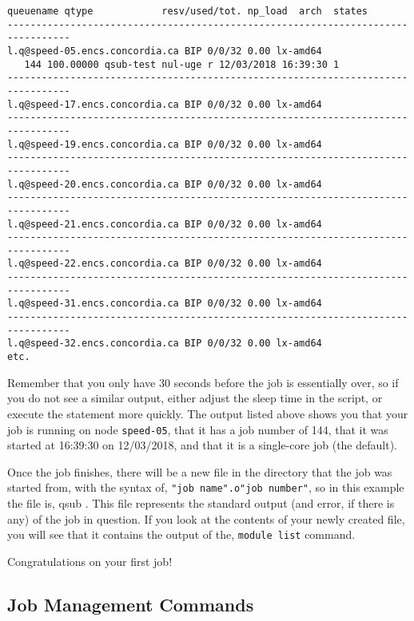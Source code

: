 \documentclass{easychair}
\begin{document}
\small
\begin{verbatim}
queuename qtype            resv/used/tot. np_load  arch  states
--------------------------------------------------------------------------------- 
l.q@speed-05.encs.concordia.ca BIP 0/0/32 0.00 lx-amd64
   144 100.00000 qsub-test nul-uge r 12/03/2018 16:39:30 1 
--------------------------------------------------------------------------------- 
l.q@speed-17.encs.concordia.ca BIP 0/0/32 0.00 lx-amd64  
--------------------------------------------------------------------------------- 
l.q@speed-19.encs.concordia.ca BIP 0/0/32 0.00 lx-amd64  
--------------------------------------------------------------------------------- 
l.q@speed-20.encs.concordia.ca BIP 0/0/32 0.00 lx-amd64  
--------------------------------------------------------------------------------- 
l.q@speed-21.encs.concordia.ca BIP 0/0/32 0.00 lx-amd64  
--------------------------------------------------------------------------------- 
l.q@speed-22.encs.concordia.ca BIP 0/0/32 0.00 lx-amd64  
--------------------------------------------------------------------------------- 
l.q@speed-31.encs.concordia.ca BIP 0/0/32 0.00 lx-amd64  
--------------------------------------------------------------------------------- 
l.q@speed-32.encs.concordia.ca BIP 0/0/32 0.00 lx-amd64  
etc.
\end{verbatim}
\normalsize

Remember that you only have 30 seconds before the job is essentially over, so 
if you do not see a similar output, either adjust the sleep time in the 
script, or execute the  statement more quickly. The  
output listed above shows you that your job is 
running on node \texttt{speed-05}, that it has a job number of 144, that it 
was started at 16:39:30 on 12/03/2018, and that it is a single-core job (the 
default). 

Once the job finishes, there will be a new file in the directory that the job 
was started from, with the syntax of, \texttt{"job name".o"job number"}, so 
in this example the file is, qsub . This file represents the 
standard output (and error, if there is any) of the job in question. If you 
look at the contents of your newly created file, you will see that it 
contains the output of the, \texttt{module list} command. 

Congratulations on your first job! 

\subsection{Job Management Commands}
\label{sect:job-management-commands}
\end{document}
